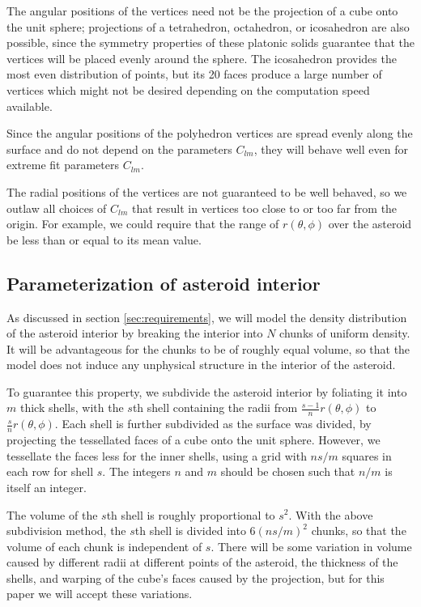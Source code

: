 \documentclass[aps,twocolumn,secnumarabic,balancelastpage,amsmath,amssymb,nofootinbib,floatfix]{revtex4-1}
\begin{document}
The angular positions of the vertices need not be the projection of a cube onto the unit sphere; projections of a tetrahedron, octahedron, or icosahedron are also possible, since the symmetry properties of these platonic solids guarantee that the vertices will be placed evenly around the sphere. The icosahedron provides the most even distribution of points, but its 20 faces produce a large number of vertices which might not be desired depending on the computation speed available.

Since the angular positions of the polyhedron vertices are spread evenly along the surface and do not depend on the parameters $C_{lm}$, they will behave well even for extreme fit parameters $C_{lm}$.

The radial positions of the vertices are not guaranteed to be well behaved, so we outlaw all choices of $C_{lm}$ that result in vertices too close to or too far from the origin. For example, we could require that the range of $r(\theta, \phi)$ over the asteroid be less than or equal to its mean value.



\subsection{Parameterization of asteroid interior}
As discussed in section \ref{sec:requirements}, we will model the density distribution of the asteroid interior by breaking the interior into $N$ chunks of uniform density. It will be advantageous for the chunks to be of roughly equal volume, so that the model does not induce any unphysical structure in the interior of the asteroid.

To guarantee this property, we subdivide the asteroid interior by foliating it into $m$ thick shells, with the $s$th shell containing the radii from $\frac{s-1}{n}r(\theta, \phi)$ to $\frac{s}{n}r(\theta, \phi)$. Each shell is further subdivided as the surface was divided, by projecting the tessellated faces of a cube onto the unit sphere. However, we tessellate the faces less for the inner shells, using a grid with $ns / m$ squares in each row for shell $s$. The integers $n$ and $m$ should be chosen such that $n/m$ is itself an integer.

The volume of the $s$th shell is roughly proportional to $s^2$. With the above subdivision method, the $s$th shell is divided into $6(ns / m)^2$ chunks, so that the volume of each chunk is independent of $s$. There will be some variation in volume caused by different radii at different points of the asteroid, the thickness of the shells, and warping of the cube's faces caused by the projection, but for this paper we will accept these variations.
\end{document}
